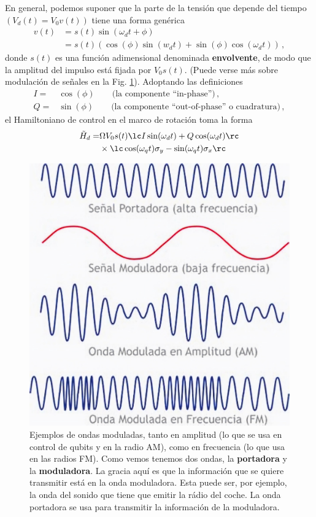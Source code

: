         En general, podemos suponer que la parte de la tensión que depende del tiempo $(V_d(t) = V_0 v(t))$ tiene una forma genérica
        \begin{equation}
            \begin{aligned}
                v(t) & = s(t) \sin (\omega_d t + \phi ) \\
                & = s(t) (\cos (\phi) \sin (w_d t) + \sin (\phi) \cos (\omega_d t))\, ,
            \end{aligned}
        \end{equation}
        donde $s(t)$ es una función adimensional denominada \textbf{envolvente}, de modo que la amplitud del impulso está fijada por $V_0 s(t)$. (Puede verse más sobre modulación de señales en la Fig. \ref{Fig_scq_modulacion}). Adoptando las definiciones
        \begin{equation}
            \begin{aligned}
                I = & \cos (\phi) \qquad \text{(la componente ``in-phase'')} \, ,  \\  
                Q = & \sin (\phi) \qquad \text{(la componente ``out-of-phase'' o cuadratura)} \, ,
            \end{aligned}
        \end{equation}
        el Hamiltoniano de control en el marco de rotación toma la forma
        \begin{equation} \label{ec_scq_Hd_QI_1}
            \begin{aligned}
                \tilde{H}_d  = & \Omega V_0 s(t) \lc I \sin (\omega_d t) + Q \cos (\omega_d t) \rc \\
                & \times \lc \cos (\omega_q t)\sigma_y - \sin(\omega_qt) \sigma_x \rc
            \end{aligned}
        \end{equation}


    	\begin{figure}[t]
        	\centering 
        	\includegraphics[width=0.4\linewidth]{Figuras/Fig_scq_modulacion.jpg}
        	\caption{Ejemplos de ondas moduladas, tanto en amplitud (lo que se usa en control de qubits y en la radio AM), como en frecuencia (lo que usa en las radios FM). Como vemos tenemos dos ondas, la \textbf{portadora} y la \textbf{moduladora}. La gracia aquí es que la información que se quiere transmitir está en la onda moduladora. Esta puede ser, por ejemplo, la onda del sonido que tiene que emitir la rádio del coche. La onda portadora se usa para transmitir la información de la moduladora.}
        	\label{Fig_scq_modulacion}
    	\end{figure}

